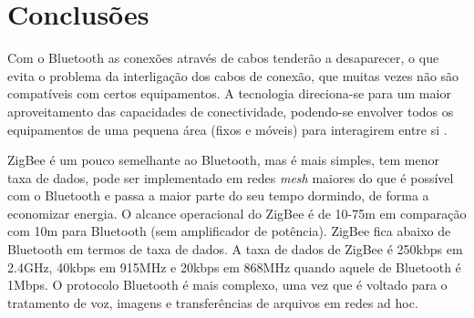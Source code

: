 \documentclass[conference]{IEEEtran}
\begin{document}




\section{Conclusões} \label{conclusoes}
Com o Bluetooth as conexões através de cabos tenderão a desaparecer, o que evita o problema da interligação dos cabos de conexão, que muitas vezes não são compatíveis com certos equipamentos. 
A tecnologia direciona-se para um maior aproveitamento das capacidades de conectividade, podendo-se envolver todos os equipamentos de uma pequena área (fixos e móveis) para interagirem entre si \cite{kobayashi2004tecnologia}.

ZigBee é um pouco semelhante ao Bluetooth, mas é mais simples, tem menor taxa de dados, pode ser implementado em redes \textit{mesh} maiores do que é possível com o Bluetooth e passa a maior parte do seu tempo dormindo, de forma a economizar energia.
O alcance operacional do ZigBee é de 10-75m em comparação com 10m para Bluetooth (sem amplificador de potência).
ZigBee fica abaixo de Bluetooth em termos de taxa de dados. A taxa de dados de ZigBee é 250kbps em 2.4GHz, 40kbps em 915MHz e 20kbps em 868MHz quando aquele de Bluetooth é 1Mbps.
O protocolo Bluetooth é mais complexo, uma vez que é voltado para o tratamento de voz, imagens e transferências de arquivos em redes ad hoc. 

{}

\end{document}

